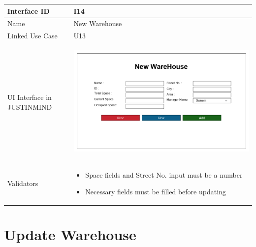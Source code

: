 \documentclass[12pt,a4paper]{report}
\begin{document}
\begin{tabular}{ | m{3cm} | m{12cm}| } \hline

Interface ID &  I14 \\\hline

Name  & New Warehouse  \\ \hline

Linked Use Case & U13	 \\ \hline

UI Interface in JUSTINMIND & \begin{center} \includegraphics[scale=0.3]{./UIs for Latex Reports/UI-014 AddWarehouse@1x.png}\end{center}  \\ \hline

Validators & 
\begin{itemize}
\item   Space fields and Street No. input must be a number
\item  Necessary fields must be filled before updating


\end{itemize}
\\ \hline

\end{tabular} 
\section{Update Warehouse }
\end{document}
